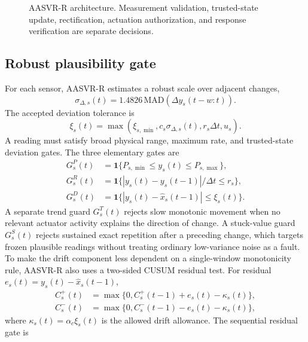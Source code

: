 \documentclass[preprint,12pt,doubleblind]{elsarticle}
\begin{document}
\begin{figure}[!htbp]
\centering
\resizebox{0.98\linewidth}{!}{}
\caption{AASVR-R architecture. Measurement validation, trusted-state update, rectification, actuation authorization, and response verification are separate decisions.}
\label{fig:architecture}
\end{figure}

\subsection{Robust plausibility gate}
For each sensor, AASVR-R estimates a robust scale over adjacent changes,
\begin{equation}
\sigma_{\Delta,s}(t)=1.4826\,\mathrm{MAD}\left(\Delta y_s(t-w:t)\right).
\end{equation}
The accepted deviation tolerance is
\begin{equation}
\xi_s(t)=\max(\xi_{s,\min},c_s\sigma_{\Delta,s}(t),r_s\Delta t,u_s).
\end{equation}
A reading must satisfy broad physical range, maximum rate, and trusted-state deviation gates. The three elementary gates are
\begin{equation}
\begin{aligned}
G^{P}_s(t)&=\mathbf{1}\{P_{s,\min}\le y_s(t)\le P_{s,\max}\},\\
G^{R}_s(t)&=\mathbf{1}\{|y_s(t)-y_s(t-1)|/\Delta t\le r_s\},\\
G^{D}_s(t)&=\mathbf{1}\{|y_s(t)-\hat{x}_s(t-1)|\le \xi_s(t)\}.
\end{aligned}
\end{equation}
A separate trend guard $G^{T}_s(t)$ rejects slow monotonic movement when no relevant actuator activity explains the direction of change. A stuck-value guard $G^{S}_s(t)$ rejects sustained exact repetition after a preceding change, which targets frozen plausible readings without treating ordinary low-variance noise as a fault. To make the drift component less dependent on a single-window monotonicity rule, AASVR-R also uses a two-sided CUSUM residual test. For residual $e_s(t)=y_s(t)-\hat{x}_s(t-1)$,
\begin{equation}
\begin{aligned}
C_s^+(t)&=\max\{0,C_s^+(t-1)+e_s(t)-\kappa_s(t)\},\\
C_s^-(t)&=\max\{0,C_s^-(t-1)-e_s(t)-\kappa_s(t)\},
\end{aligned}
\end{equation}
where $\kappa_s(t)=\alpha_c\xi_s(t)$ is the allowed drift allowance. The sequential residual gate is
\end{document}
